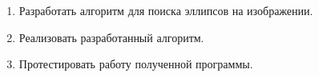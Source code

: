 \Task
\begin{enumerate}
  \item
Разработать алгоритм для поиска эллипсов на изображении.
  \item
Реализовать разработанный алгоритм.
  \item
Протестировать работу полученной программы.
\end{enumerate}
\clearpage
